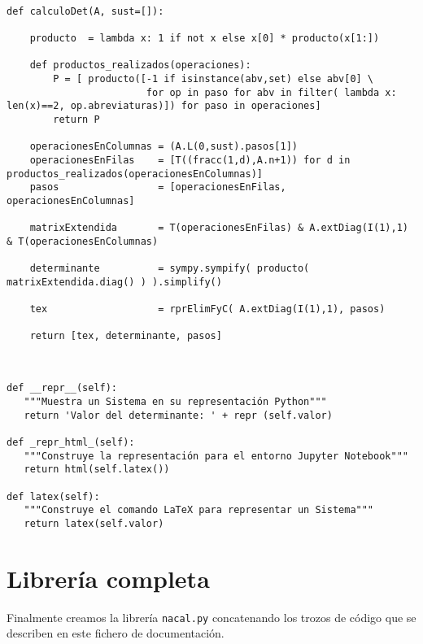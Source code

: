 \documentclass[11pt]{report}
\begin{document}
\begin{verbatim}

def calculoDet(A, sust=[]):
    
    producto  = lambda x: 1 if not x else x[0] * producto(x[1:])
    
    def productos_realizados(operaciones):
        P = [ producto([-1 if isinstance(abv,set) else abv[0] \
                        for op in paso for abv in filter( lambda x: len(x)==2, op.abreviaturas)]) for paso in operaciones]
        return P
    
    operacionesEnColumnas = (A.L(0,sust).pasos[1])
    operacionesEnFilas    = [T((fracc(1,d),A.n+1)) for d in productos_realizados(operacionesEnColumnas)]
    pasos                 = [operacionesEnFilas, operacionesEnColumnas]
    
    matrixExtendida       = T(operacionesEnFilas) & A.extDiag(I(1),1) & T(operacionesEnColumnas)
    
    determinante          = sympy.sympify( producto( matrixExtendida.diag() ) ).simplify()
    
    tex                   = rprElimFyC( A.extDiag(I(1),1), pasos)
    
    return [tex, determinante, pasos]
    
\end{verbatim}

\begin{verbatim}

def __repr__(self):
   """Muestra un Sistema en su representación Python"""
   return 'Valor del determinante: ' + repr (self.valor)

def _repr_html_(self):
   """Construye la representación para el entorno Jupyter Notebook"""
   return html(self.latex())

def latex(self):
   """Construye el comando LaTeX para representar un Sistema"""
   return latex(self.valor)

\end{verbatim}


\part{Librería completa}
\label{sec:org150b880}

Finalmente creamos la librería \texttt{nacal.py} concatenando los trozos de
código que se describen en este fichero de documentación.
\end{document}
